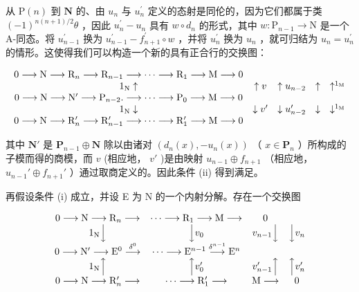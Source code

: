 从 \(\mathrm{P}(n)\) 到 \(\mathbf{N}\) 的、由 \(u_{n}\) 与 \(u_{n}^{\prime}\) 定义的态射是同伦的，因为它们都属于类 \((-1)^{n(n + 1) / 2}\theta\) ，因此 \(u_{n}^{\prime} - u_{n}\) 具有 \(w\circ d_n\) 的形式，其中 \(w:\mathrm{P}_{n - 1}\to \mathrm{N}\) 是一个 A-同态。将 \(u_{n - 1}^{\prime}\) 换为 \(u_{n - 1}^{\prime} - f_{n + 1}^{\prime}\circ w\) ，并将 \(u_{n}^{\prime}\) 换为 \(u_{n}\) ，就可归结为 \(u_{n} = u_{n}^{\prime}\) 的情形。这使得我们可以构造一个新的具有正合行的交换图：

\[
\begin{array}{c c c c c c c} 0 \longrightarrow \mathrm{N} \longrightarrow \mathrm{R} _ {n} \longrightarrow \mathrm{R} _ {n - 1} \longrightarrow \dots \longrightarrow \mathrm{R} _ {1} \longrightarrow \mathrm{M} \longrightarrow 0 \\ 1 _ {\mathrm{N}} \uparrow & \uparrow v & \uparrow u _ {n - 2} & \uparrow & \uparrow^ {1 _ {\mathrm{M}}} \\ 0 \longrightarrow \mathrm{N} \longrightarrow \mathrm{N} ^ {\prime} \longrightarrow \mathrm{P} _ {n - 2}. \longrightarrow \dots \longrightarrow \mathrm{P} _ {0} \longrightarrow \mathrm{M} \longrightarrow 0 \\ 1 _ {\mathrm{N}} \downarrow & \downarrow v ^ {\prime} & \downarrow u _ {n - 2} ^ {\prime} & \downarrow & \downarrow^ {1 _ {\mathrm{M}}} \\ 0 \longrightarrow \mathrm{N} \longrightarrow \mathrm{R} _ {n} ^ {\prime} \longrightarrow \mathrm{R} _ {n - 1} ^ {\prime} \longrightarrow \dots \longrightarrow \mathrm{R} _ {1} ^ {\prime} \longrightarrow \mathrm{M} \longrightarrow 0 \end{array}
\]

其中 \(\mathbf{N}'\) 是 \(\mathbf{P}_{n-1} \oplus \mathbf{N}\) 除以由诸对 \((d_n(x), -u_n(x))\) （ \(x \in \mathbf{P}_n\) ）所构成的子模而得的商模，而 \(v\) (相应地， \(v'\) )是由映射 \(u_{n-1} \oplus f_{n+1}\) （相应地， \(u_{n-1}' \oplus f_{n+1}'\) ）通过取商定义的。因此条件 (ii) 得到满足。

再假设条件 (i) 成立，并设 E 为 N 的一个内射分解。存在一个交换图

\[
\begin{array}{c c c c c c c} 0 \longrightarrow \mathrm{N} \longrightarrow \mathrm{R} _ {n} \longrightarrow & \dots \longrightarrow \mathrm{R} _ {1} \longrightarrow \mathrm{M} \longrightarrow & 0 \\ 1 _ {\mathrm{N}} \Big \downarrow & \Big \downarrow v _ {0} & v _ {n - 1} \Big \downarrow & \Big \downarrow v _ {n} \\ 0 \longrightarrow \mathrm{N} ^ {\prime} \longrightarrow \mathrm{E} ^ {0} \stackrel {{\delta^ {0}}} {{\longrightarrow}} & \dots \longrightarrow \mathrm{E} ^ {n - 1} \stackrel {{\delta^ {n - 1}}} {{\longrightarrow}} \mathrm{E} ^ {n} \\ 1 _ {\mathrm{N}} \Big \uparrow & \Big \uparrow v _ {0} ^ {\prime} & v _ {n - 1} ^ {\prime} \Big \uparrow & \Big \uparrow v _ {n} ^ {\prime} \\ 0 \longrightarrow \mathrm{N} \longrightarrow \mathrm{R} _ {n} ^ {\prime} \longrightarrow & \dots \longrightarrow \mathrm{R} _ {1} ^ {\prime} \longrightarrow & \mathrm{M} \longrightarrow & 0 \end{array}
\]

